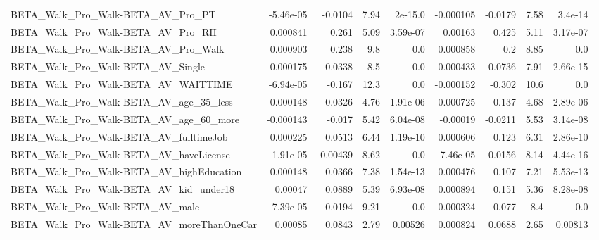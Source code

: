\begin{tabular}{lrrrrrrrr}
BETA\_Walk\_Pro\_Walk-BETA\_AV\_Pro\_PT                  &   -5.46e-05 &      -0.0104 &      7.94 &  2e-15.0 &  -0.000105 &     -0.0179 &         7.58 &       3.4e-14 \\
BETA\_Walk\_Pro\_Walk-BETA\_AV\_Pro\_RH                  &    0.000841 &        0.261 &      5.09 & 3.59e-07 &    0.00163 &       0.425 &         5.11 &      3.17e-07 \\
BETA\_Walk\_Pro\_Walk-BETA\_AV\_Pro\_Walk                &    0.000903 &        0.238 &       9.8 &      0.0 &   0.000858 &         0.2 &         8.85 &           0.0 \\
BETA\_Walk\_Pro\_Walk-BETA\_AV\_Single                  &   -0.000175 &      -0.0338 &       8.5 &      0.0 &  -0.000433 &     -0.0736 &         7.91 &      2.66e-15 \\
BETA\_Walk\_Pro\_Walk-BETA\_AV\_WAITTIME                &   -6.94e-05 &       -0.167 &      12.3 &      0.0 &  -0.000152 &      -0.302 &         10.6 &           0.0 \\
BETA\_Walk\_Pro\_Walk-BETA\_AV\_age\_35\_less             &    0.000148 &       0.0326 &      4.76 & 1.91e-06 &   0.000725 &       0.137 &         4.68 &      2.89e-06 \\
BETA\_Walk\_Pro\_Walk-BETA\_AV\_age\_60\_more             &   -0.000143 &       -0.017 &      5.42 & 6.04e-08 &   -0.00019 &     -0.0211 &         5.53 &      3.14e-08 \\
BETA\_Walk\_Pro\_Walk-BETA\_AV\_fulltimeJob             &    0.000225 &       0.0513 &      6.44 & 1.19e-10 &   0.000606 &       0.123 &         6.31 &      2.86e-10 \\
BETA\_Walk\_Pro\_Walk-BETA\_AV\_haveLicense             &   -1.91e-05 &     -0.00439 &      8.62 &      0.0 &  -7.46e-05 &     -0.0156 &         8.14 &      4.44e-16 \\
BETA\_Walk\_Pro\_Walk-BETA\_AV\_highEducation           &    0.000148 &       0.0366 &      7.38 & 1.54e-13 &   0.000476 &       0.107 &         7.21 &      5.53e-13 \\
BETA\_Walk\_Pro\_Walk-BETA\_AV\_kid\_under18             &     0.00047 &       0.0889 &      5.39 & 6.93e-08 &   0.000894 &       0.151 &         5.36 &      8.28e-08 \\
BETA\_Walk\_Pro\_Walk-BETA\_AV\_male                    &   -7.39e-05 &      -0.0194 &      9.21 &      0.0 &  -0.000324 &      -0.077 &          8.4 &           0.0 \\
BETA\_Walk\_Pro\_Walk-BETA\_AV\_moreThanOneCar          &     0.00085 &       0.0843 &      2.79 &  0.00526 &   0.000824 &      0.0688 &         2.65 &       0.00813 \\

\end{tabular}

